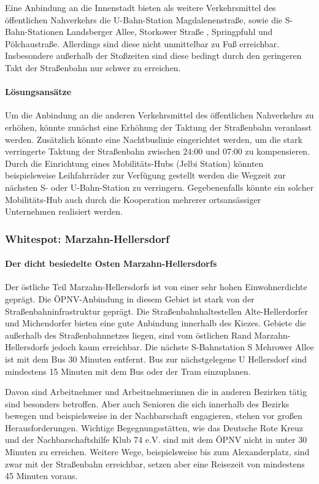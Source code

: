 Eine Anbindung an die Innenstadt bieten als weitere Verkehrsmittel des öffentlichen Nahverkehrs die U-Bahn-Station Magdalenenstraße, sowie die S-Bahn-Stationen Landsberger Allee, Storkower Straße , Springpfuhl und Pölchaustraße. Allerdings sind diese nicht unmittelbar zu Fuß erreichbar. Insbesondere außerhalb der Stoßzeiten sind diese bedingt durch den geringeren Takt der Straßenbahn nur schwer zu erreichen.

\paragraph{Lösungsansätze}
Um die Anbindung an die anderen Verkehrsmittel des öffentlichen Nahverkehrs zu erhöhen, könnte zunächst eine Erhöhung der Taktung der Straßenbahn veranlasst werden. Zusätzlich könnte eine Nachtbuslinie eingerichtet werden, um die stark verringerte Taktung der Straßenbahn zwischen 24:00 und 07:00 zu kompensieren. Durch die Einrichtung eines Mobilitäts-Hubs (Jelbi Station) könnten beispielsweise Leihfahrräder zur Verfügung gestellt werden die Wegzeit zur nächsten S- oder U-Bahn-Station zu verringern. Gegebenenfalls könnte ein solcher Mobilitäts-Hub auch durch die Kooperation mehrerer ortsansässiger Unternehmen realisiert werden.










\subsubsection{Whitespot: Marzahn-Hellersdorf}
\paragraph{Der dicht besiedelte Osten Marzahn-Hellersdorfs}
Der östliche Teil Marzahn-Hellersdorfs ist von einer sehr hohen Einwohnerdichte geprägt. Die ÖPNV-Anbindung in diesem Gebiet ist stark von der Straßenbahninfrastruktur geprägt. Die Straßenbahnhaltestellen Alte-Hellerdorfer und Michendorfer bieten eine gute Anbindung innerhalb des Kiezes. Gebiete die außerhalb des Straßenbahnnetzes liegen, sind vom östlichen Rand Marzahn-Hellersdorfs jedoch kaum erreichbar. Die nächste S-Bahnstation S Mehrower Allee ist mit dem Bus 30 Minuten entfernt. Bus zur nächstgelegene U Hellersdorf sind mindestens 15 Minuten mit dem Bus oder der Tram einzuplanen.

Davon sind Arbeitnehmer und Arbeitnehmerinnen die in anderen Bezirken tätig sind besonders betroffen. Aber auch Senioren die sich innerhalb des Bezirks bewegen und beispielsweise in der Nachbarschaft engagieren, stehen vor großen Herausforderungen. Wichtige Begegnungsstätten, wie das Deutsche Rote Kreuz und der Nachbarschaftshilfe Klub 74 e.V. sind mit dem ÖPNV nicht in unter 30 Minuten zu erreichen. Weitere Wege, beispielsweise bis zum Alexanderplatz, sind zwar mit der Straßenbahn erreichbar, setzen aber eine Reisezeit von mindestens 45 Minuten voraus.

